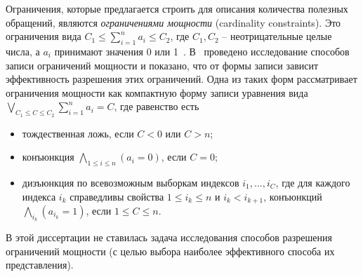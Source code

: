 Ограничения, которые предлагается строить для описания количества полезных обращений, являются \emph{ограничениями мощности} (cardinality constraints). Это
ограничения вида $C_1 \leqslant \sum_{i=1}^n a_i \leqslant C_2$, где $C_1, C_2$
-- неотрицательные целые числа, а $a_i$ принимают значения 0 или
1~\cite{smt_debugging, PiskacK08, KuncakR07,
Revesz05}. %
В~\cite{smt_debugging} проведено исследование способов записи
ограничений мощности и показано, что от формы записи зависит
эффективность разрешения этих ограничений. Одна из таких форм рассматривает ограничения
мощности как компактную форму записи уравнения
вида $\bigvee_{C_1 \leqslant C \leqslant C_2} \sum_{i=1}^n a_i = C$,
где равенство есть
\begin{itemize}
\item тождественная ложь, если $C < 0$ или $C > n$;
\item конъюнкция $\bigwedge_{1\leqslant i\leqslant n} (a_i = 0)$,
если $C = 0$;
\item дизъюнкция по всевозможным выборкам индексов $i_1, ..., i_C$, где
для каждого индекса $i_k$ справедливы свойства $1 \leqslant i_k
\leqslant n$ и $i_k < i_{k+1}$, конъюнкций $\bigwedge_{i_k} (a_{i_k}
= 1)$, если $1 \leqslant C \leqslant n$.
\end{itemize}

В этой диссертации не ставилась задача исследования способов разрешения ограничений
мощности (с целью выбора наиболее эффективного способа их представления).


